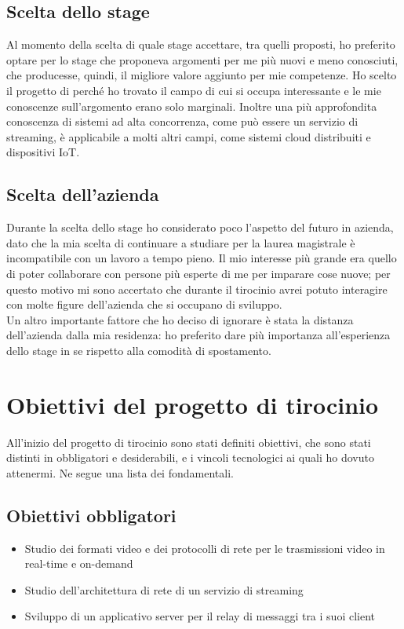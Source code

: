    \subsection{Scelta dello stage}
   Al momento della scelta di quale stage accettare, tra quelli proposti, ho preferito optare per lo stage che proponeva argomenti per me più nuovi e meno conosciuti, che producesse, quindi, il migliore valore aggiunto per mie competenze.
   Ho scelto il progetto di \nomeAzienda{} perché ho trovato il campo di cui si occupa interessante e le mie conoscenze sull'argomento erano solo marginali. Inoltre una più approfondita conoscenza di sistemi ad alta concorrenza, come può essere un servizio di streaming, è applicabile a molti altri campi, come sistemi cloud distribuiti e dispositivi IoT.

   \subsection{Scelta dell'azienda}
   Durante la scelta dello stage ho considerato poco l'aspetto del futuro in azienda, dato che la mia scelta di continuare a studiare per la laurea magistrale è incompatibile con un lavoro a tempo pieno. Il mio interesse più grande era quello di poter collaborare con persone più esperte di me per imparare cose nuove; per questo motivo mi sono accertato che durante il tirocinio avrei potuto interagire con molte figure dell'azienda che si occupano di sviluppo.
   \\
   Un altro importante fattore che ho deciso di ignorare è stata la distanza dell'azienda dalla mia residenza: ho preferito dare più importanza all'esperienza dello stage in se rispetto alla comodità di spostamento.

\section{Obiettivi del progetto di tirocinio}
All'inizio del progetto di tirocinio sono stati definiti obiettivi, che sono stati distinti in obbligatori e desiderabili, e i vincoli tecnologici ai quali ho dovuto attenermi. Ne segue una lista dei fondamentali.

   \subsection{Obiettivi obbligatori}
   \begin{itemize}
      \item{Studio dei formati video e dei protocolli di rete per le trasmissioni video in real-time e on-demand}
      \item{Studio dell'architettura di rete di un servizio di streaming}
      \item{Sviluppo di un applicativo server per il relay di messaggi tra i suoi client}
   \end{itemize}
      
